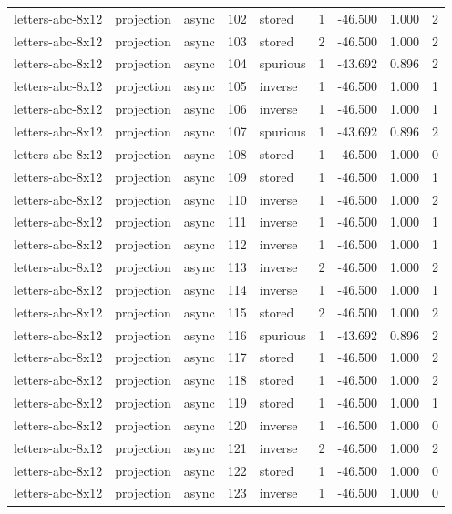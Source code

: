 \begin{tabular}{lllrlrrrr}
letters-abc-8x12 & projection & async & 102 & stored & 1 & -46.500 & 1.000 & 2 \\
letters-abc-8x12 & projection & async & 103 & stored & 2 & -46.500 & 1.000 & 2 \\
letters-abc-8x12 & projection & async & 104 & spurious & 1 & -43.692 & 0.896 & 2 \\
letters-abc-8x12 & projection & async & 105 & inverse & 1 & -46.500 & 1.000 & 1 \\
letters-abc-8x12 & projection & async & 106 & inverse & 1 & -46.500 & 1.000 & 1 \\
letters-abc-8x12 & projection & async & 107 & spurious & 1 & -43.692 & 0.896 & 2 \\
letters-abc-8x12 & projection & async & 108 & stored & 1 & -46.500 & 1.000 & 0 \\
letters-abc-8x12 & projection & async & 109 & stored & 1 & -46.500 & 1.000 & 1 \\
letters-abc-8x12 & projection & async & 110 & inverse & 1 & -46.500 & 1.000 & 2 \\
letters-abc-8x12 & projection & async & 111 & inverse & 1 & -46.500 & 1.000 & 1 \\
letters-abc-8x12 & projection & async & 112 & inverse & 1 & -46.500 & 1.000 & 1 \\
letters-abc-8x12 & projection & async & 113 & inverse & 2 & -46.500 & 1.000 & 2 \\
letters-abc-8x12 & projection & async & 114 & inverse & 1 & -46.500 & 1.000 & 1 \\
letters-abc-8x12 & projection & async & 115 & stored & 2 & -46.500 & 1.000 & 2 \\
letters-abc-8x12 & projection & async & 116 & spurious & 1 & -43.692 & 0.896 & 2 \\
letters-abc-8x12 & projection & async & 117 & stored & 1 & -46.500 & 1.000 & 2 \\
letters-abc-8x12 & projection & async & 118 & stored & 1 & -46.500 & 1.000 & 2 \\
letters-abc-8x12 & projection & async & 119 & stored & 1 & -46.500 & 1.000 & 1 \\
letters-abc-8x12 & projection & async & 120 & inverse & 1 & -46.500 & 1.000 & 0 \\
letters-abc-8x12 & projection & async & 121 & inverse & 2 & -46.500 & 1.000 & 2 \\
letters-abc-8x12 & projection & async & 122 & stored & 1 & -46.500 & 1.000 & 0 \\
letters-abc-8x12 & projection & async & 123 & inverse & 1 & -46.500 & 1.000 & 0 \\

\end{tabular}
